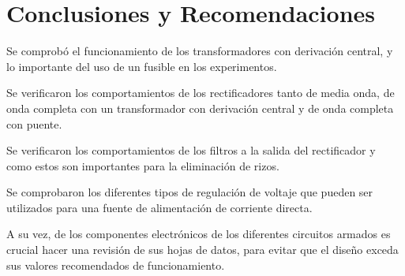 \section{Conclusiones y Recomendaciones}
Se comprobó el funcionamiento de los transformadores con derivación central, y
lo importante del uso de un fusible en los experimentos.

Se verificaron los comportamientos de los rectificadores tanto de media onda, de
onda completa con un transformador con derivación central y de onda completa con
puente.

Se verificaron los comportamientos de los filtros a la salida del rectificador y
como estos son importantes para la eliminación de rizos.

Se comprobaron los diferentes tipos de regulación de voltaje que pueden ser
utilizados para una fuente de alimentación de corriente directa.

A su vez, de los componentes electrónicos de los diferentes circuitos armados
es crucial hacer una revisión de sus hojas de datos, para evitar que el diseño
exceda sus valores recomendados de funcionamiento.

